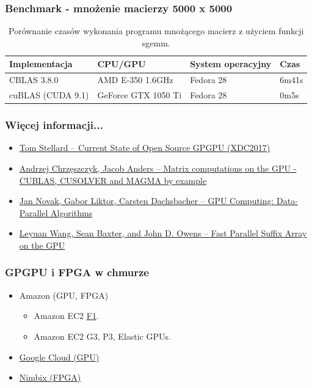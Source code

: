 \documentclass[dvipsnames,table]{beamer}
\begin{document}
\begin{frame}
\frametitle{Benchmark - mnożenie macierzy 5000 x 5000}
\begin{table}[]
\centering
\caption{Porównanie czasów wykonania programu mnożącego macierz z użyciem funkcji sgemm.}
\label{porownanie}
\scriptsize
\begin{tabular}{llll}
\hline
Implementacja & CPU/GPU   & System operacyjny & Czas  \\ \hline
CBLAS 3.8.0   & AMD E-350 1.6GHz & Fedora 28         & 6m41s \\
cuBLAS (CUDA 9.1) & GeForce GTX 1050 Ti & Fedora 28 & 0m5s  \\ \hline
\end{tabular}
\normalsize
\end{table}
\end{frame}

\begin{frame}
\frametitle{Więcej informacji...}
\begin{itemize}
	\item \href{https://www.x.org/wiki/Events/XDC2017/Stellard_GPGPU.pdf}{Tom Stellard -- Current State of Open Source GPGPU (XDC2017)}
	\item \href{https://developer.nvidia.com/sites/default/files/akamai/cuda/files/Misc/mygpu.pdf}{Andrzej Chrzęszczyk, Jacob Anders -- Matrix computations on the GPU - CUBLAS, CUSOLVER and MAGMA by example}
	\item \href{https://cg.ivd.kit.edu/downloads/GPUComputing_assignment_2.pdf}{Jan Novak, Gabor Liktor, Carsten Dachsbacher -- GPU Computing: Data-Parallel Algorithms}
	\item \href{https://pdfs.semanticscholar.org/presentation/624a/e2c934200ea7f09b9d6412685ef11f81c810.pdf}{Leyuan Wang, Sean Baxter, and John D. Owens -- Fast Parallel Suffix Array on the GPU}

\end{itemize}
\end{frame}

\begin{frame}
	\frametitle{GPGPU i FPGA w chmurze}
\begin{itemize}
	\item Amazon (GPU, FPGA)
	\begin{itemize}
		\item Amazon EC2 \href{https://aws.amazon.com/ec2/instance-types/f1/}{F1}.
		\item Amazon EC2 G3, P3, Elastic GPUs.
	\end{itemize}
	\item \href{https://cloud.google.com/gpu/}{Google Cloud (GPU)}
	\item \href{https://www.nimbix.net/xilinx/}{Nimbix (FPGA)}
\end{itemize}
\end{frame}
\end{document}
